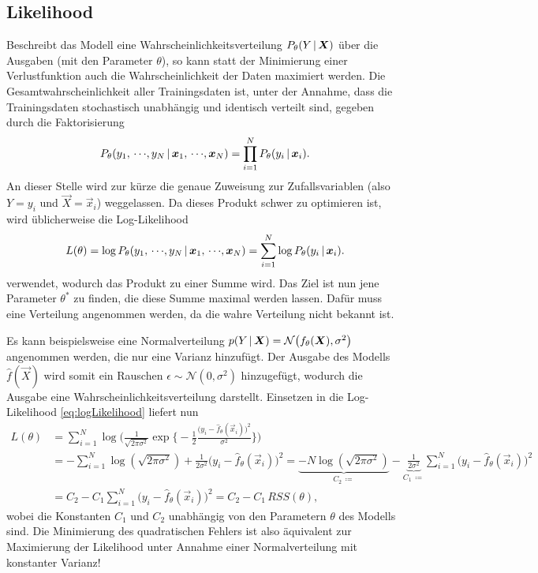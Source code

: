 		\subsection{Likelihood}
			Beschreibt das Modell eine Wahrscheinlichkeitsverteilung \( P_\theta(Y \,\vert\, \bm{X}) \) über die Ausgaben (mit den Parameter \(\theta\)), so kann statt der Minimierung einer Verlustfunktion auch die Wahrscheinlichkeit der Daten maximiert werden. Die Gesamtwahrscheinlichkeit aller Trainingsdaten ist, unter der Annahme, dass die Trainingsdaten stochastisch unabhängig und identisch verteilt sind, gegeben durch die Faktorisierung
			\begin{equation}
				P_\theta(y_1,\,\cdots\!,y_N \,\vert\, \bm{x}_1,\,\cdots\!,\bm{x}_N) = \prod_{i = 1}^{N} P_\theta(y_i \,\vert\, \bm{x}_i).
			\end{equation}
			An dieser Stelle wird zur kürze die genaue Zuweisung zur Zufallsvariablen (also \( Y = y_i \) und \( \vec{X} = \vec{x}_i \)) weggelassen. Da dieses Produkt schwer zu optimieren ist, wird üblicherweise die Log-Likelihood
			\begin{equation}
				L(\theta) = \log P_\theta(y_1,\,\cdots\!,y_N \,\vert\, \bm{x}_1,\,\cdots\!,\bm{x}_N) = \sum_{i = 1}^{N} \log P_\theta(y_i \,\vert\, \bm{x}_i).  \label{eq:logLikelihood}
			\end{equation}
			verwendet, wodurch das Produkt zu einer Summe wird. Das Ziel ist nun jene Parameter \(\theta^\ast\) zu finden, die diese Summe maximal werden lassen. Dafür muss eine Verteilung angenommen werden, da die wahre Verteilung nicht bekannt ist.

			Es kann beispielsweise eine Normalverteilung \( p(Y \,\vert\, \bm{X}) = \mathcal{N}\big( f_\theta(\bm{X}), \sigma^2 \big) \) angenommen werden, die nur eine Varianz hinzufügt. Der Ausgabe des Modells \( \hat{f}(\vec{X}) \) wird somit ein Rauschen \( \epsilon \sim \mathcal{N}(0, \sigma^2) \) hinzugefügt, wodurch die Ausgabe eine Wahrscheinlichkeitsverteilung darstellt. Einsetzen in die Log-Likelihood \eqref{eq:logLikelihood} liefert nun
			\begin{align}
				L(\theta)
					&= \sum_{i = 1}^{N} \log\!\bigg(\! \frac{1}{\sqrt{2\pi \sigma^2}} \exp\bigg\{\!\! -\frac{1}{2} \frac{\big( y_i - \hat{f}_\theta(\vec{x}_i) \big)^2}{\sigma^2} \bigg\} \!\bigg) \\
					&= -\sum_{i = 1}^{N} \log(\!\sqrt{2\pi \sigma^2}) + \frac{1}{2 \sigma^2} \big( y_i - \hat{f}_\theta(\vec{x}_i) \big)^2
					 = \underbrace{-N \log(\!\sqrt{2\pi \sigma^2})}_{C_2 \,\coloneqq} - \underbrace{\frac{1}{2 \sigma^2}}_{C_1 \,\coloneqq} \sum_{i = 1}^{N} \big( y_i - \hat{f}_\theta(\vec{x}_i) \big)^2 \\
					&= C_2 - C_1 \sum_{i = 1}^{N} \big( y_i - \hat{f}_\theta(\vec{x}_i) \big)^2
					 = C_2 - C_1 \, \mathit{RSS}(\theta),
			\end{align}
			wobei die Konstanten \( C_1 \) und \( C_2 \) unabhängig von den Parametern \(\theta\) des Modells sind. Die Minimierung des quadratischen Fehlers ist also äquivalent zur Maximierung der Likelihood unter Annahme einer Normalverteilung mit konstanter Varianz!

